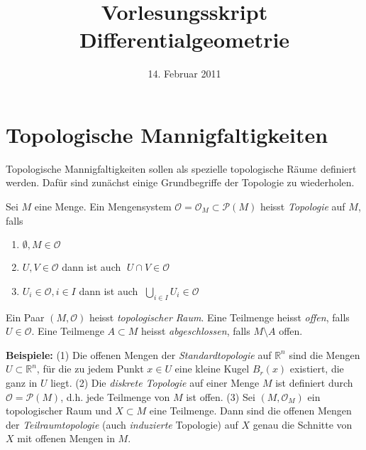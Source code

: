 \documentclass[12pt,a4paper]{article}
\date{14. Februar 2011}
\def\R{\mathbb{R}}
\begin{document}

\title{Vorlesungsskript Differentialgeometrie }
\maketitle


\section{Topologische Mannigfaltigkeiten}

Topologische Mannigfaltigkeiten sollen als spezielle topologische R\"aume definiert werden. Daf\"ur sind zun\"achst einige
Grundbegriffe der Topologie zu wiederholen.

\bigskip

Sei  $M$ eine Menge. Ein Mengensystem $\mathcal O = \mathcal O_M \subset \mathcal P(M)$ heisst {\it Topologie} auf $M$, falls
\begin{enumerate}
\item \quad $\emptyset, M \in \mathcal O$
\item \quad $U, V \in \mathcal O $  dann ist auch $\; U \cap V \in \mathcal O$
\item \quad $U_i \in \mathcal O, i \in I$  dann ist auch $\;\bigcup_{i\in I} U_i \in \mathcal O$
\end{enumerate}

\bigskip

Ein Paar $(M, \mathcal O)$ heisst {\it topologischer Raum}. Eine Teilmenge heisst
{\it offen}, falls $U \in \mathcal O$. Eine Teilmenge $A \subset M$ heisst {\it abgeschlossen}, falls
$M \setminus A$ offen.

\medskip

{\bf Beispiele:} (1) Die offenen Mengen der {\it Standardtopologie} auf $\R^n$ sind die Mengen $U \subset \R^n$, f\"ur die
zu jedem Punkt $x\in U$ eine kleine Kugel $B_r(x)$ existiert, die ganz in $U$ liegt. (2) Die {\it diskrete Topologie} auf
einer Menge $M$ ist definiert durch $\mathcal O = \mathcal P(M)$, d.h. jede Teilmenge von $M$ ist offen. (3) Sei
$(M, \mathcal O_M)$ ein topologischer Raum und $X\subset M$ eine Teilmenge. Dann sind die offenen Mengen der
{\it Teilraumtopologie} (auch {\it induzierte} Topologie) auf $X$ genau die Schnitte von $X$ mit offenen Mengen in $M$.

\bigskip
\end{document}
